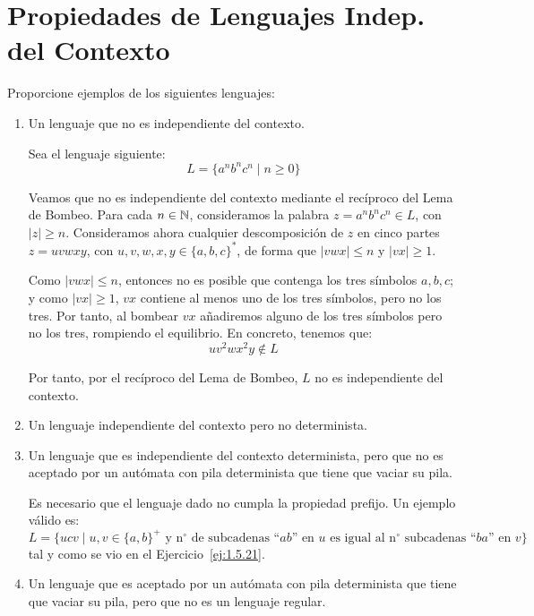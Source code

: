 \newpage
\section{Propiedades de Lenguajes Indep. del Contexto}

\begin{ejercicio}\label{ej:1.6.1}
    Proporcione ejemplos de los siguientes lenguajes:
    \begin{enumerate}
        \item Un lenguaje que no es independiente del contexto.
        
        Sea el lenguaje siguiente:
        \begin{equation*}
            L = \{a^n b^n c^n \mid n\geq 0\}
        \end{equation*}

        Veamos que no es independiente del contexto mediante el recíproco del Lema de Bombeo. Para cada $n\in \mathbb{N}$, consideramos la palabra $z=a^n b^n c^n\in L$, con $|z|\geq n$. Consideramos ahora cualquier descomposición de $z$ en cinco partes $z=uvwxy$, con $u,v,w,x,y\in {\{a,b,c\}}^{\ast}$, de forma que $|vwx|\leq n$ y $|vx|\geq 1$.

        Como $|vwx|\leq n$, entonces no es posible que contenga los tres símbolos $a,b,c$;
        y como $|vx|\geq 1$, $vx$ contiene al menos uno de los tres símbolos, pero no los tres.
        Por tanto, al bombear $vx$ añadiremos alguno de los tres símbolos pero no los tres, rompiendo el equilibrio. En concreto, tenemos que:
        \begin{equation*}
            uv^2wx^2y \notin L
        \end{equation*}

        Por tanto, por el recíproco del Lema de Bombeo, $L$ no es independiente del contexto.
        \item Un lenguaje independiente del contexto pero no determinista.
        \item Un lenguaje que es independiente del contexto determinista, pero que no es aceptado por un autómata con pila determinista que tiene que vaciar su pila.
        
        Es necesario que el lenguaje dado no cumpla la propiedad prefijo. Un ejemplo válido es:
        \begin{equation*}
            L = \{ucv\mid u,v\in {\{a,b\}}^{+} \text{\ y n$^\circ$ de subcadenas ``}ab \text{'' en\ } u \text{\ es igual al n$^\circ$ subcadenas ``} ba \text{'' en\ }v\}
        \end{equation*}
        tal y como se vio en el Ejercicio~\ref{ej:1.5.21}.
        \item Un lenguaje que es aceptado por un autómata con pila determinista que tiene que vaciar su pila, pero que no es un lenguaje regular.
        

\end{enumerate}
\end{ejercicio}
